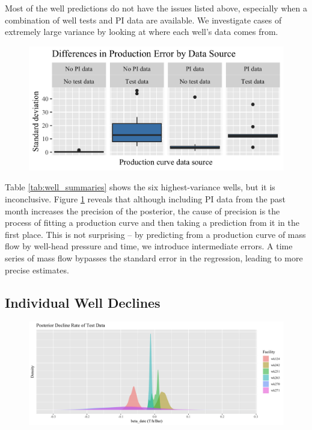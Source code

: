 \documentclass[a4paper, 12pt]{article}
\begin{document}
Most of the well predictions do not have the issues listed above, especially when a combination of well tests and PI data are available. We investigate cases of extremely large variance by looking at where each well's data comes from.



\begin{figure}
  \centering
  \includegraphics[width=.5\linewidth]{media/error_source}
  \label{fig:error_source}
\end{figure}

Table \ref{tab:well_summaries} shows the six highest-variance wells, but it is inconclusive. Figure \ref{fig:error_source} reveals that although including PI data from the past month increases the precision of the posterior, the cause of precision is the process of fitting a production curve and then taking a prediction from it in the first place. This is not surprising -- by predicting from a production curve of mass flow by well-head pressure and time, we introduce intermediate errors. A time series of mass flow bypasses the standard error in the regression, leading to more precise estimates.

\subsection{Individual Well Declines}

\begin{figure}
  \centering
  \includegraphics[width=\linewidth]{media/beta_date}
  \label{fig:beta_date}
\end{figure}
\end{document}

